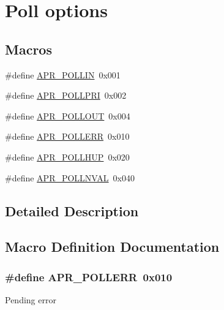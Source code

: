 \hypertarget{group__pollopts}{}\section{Poll options}
\label{group__pollopts}
\subsection*{Macros}
\begin{DoxyCompactItemize}
\item 
\#define \hyperlink{group__pollopts_ga746222e6b858bc2fc77328d59f78e788}{A\+P\+R\+\_\+\+P\+O\+L\+L\+IN}~0x001
\item 
\#define \hyperlink{group__pollopts_ga196c38e1914077c4c9a0cf3ce87f1b9c}{A\+P\+R\+\_\+\+P\+O\+L\+L\+P\+RI}~0x002
\item 
\#define \hyperlink{group__pollopts_ga6fb703db1d11e2c5f66d8c6146e56053}{A\+P\+R\+\_\+\+P\+O\+L\+L\+O\+UT}~0x004
\item 
\#define \hyperlink{group__pollopts_ga6f5a72fd9cf3f5dcf174acce0b4b77ee}{A\+P\+R\+\_\+\+P\+O\+L\+L\+E\+RR}~0x010
\item 
\#define \hyperlink{group__pollopts_gace76603c4fa4b56f8b5977ff1ceb6f3b}{A\+P\+R\+\_\+\+P\+O\+L\+L\+H\+UP}~0x020
\item 
\#define \hyperlink{group__pollopts_ga132da215e207d4685fb467cc64a73f1b}{A\+P\+R\+\_\+\+P\+O\+L\+L\+N\+V\+AL}~0x040
\end{DoxyCompactItemize}


\subsection{Detailed Description}


\subsection{Macro Definition Documentation}
\subsubsection[{\texorpdfstring{A\+P\+R\+\_\+\+P\+O\+L\+L\+E\+RR}{APR_POLLERR}}]{\setlength{\rightskip}{0pt plus 5cm}\#define A\+P\+R\+\_\+\+P\+O\+L\+L\+E\+RR~0x010}\hypertarget{group__pollopts_ga6f5a72fd9cf3f5dcf174acce0b4b77ee}{}\label{group__pollopts_ga6f5a72fd9cf3f5dcf174acce0b4b77ee}
Pending error 
